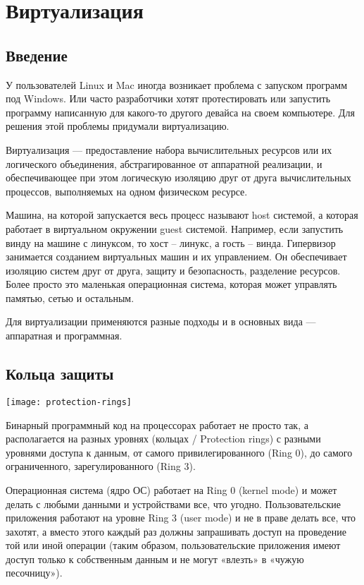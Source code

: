 \section{Виртуализация}
\subsection{Введение}
У пользователей Linux и Mac иногда возникает проблема с запуском программ под Windows.
Или часто разработчики хотят протестировать или запустить программу написанную для какого-то другого девайса на своем компьютере.
Для решения этой проблемы придумали виртуализацию.

Виртуализация — предоставление набора вычислительных ресурсов или их логического объединения, абстрагированное от аппаратной реализации, и обеспечивающее при этом логическую изоляцию друг от друга вычислительных процессов, выполняемых на одном физическом ресурсе.

Машина, на которой запускается весь процесс называют host системой, а которая работает в виртуальном окружении guest системой.
Например, если запустить винду на машине с линуксом, то хост -- линукс, а гость -- винда.
Гипервизор занимается созданием виртуальных машин и их управлением.
Он обеспечивает изоляцию систем друг от друга, защиту и безопасность, разделение ресурсов.
Более просто это маленькая операционная система, которая может управлять памятью, сетью и остальным.

Для виртуализации применяются разные подходы и в основных вида --- аппаратная и программная.

\subsection{Кольца защиты}
\texttt{[image: protection-rings]}

Бинарный программный код на процессорах работает не просто так, а располагается на разных уровнях (кольцах / Protection rings) с разными уровнями доступа к данным, от самого привилегированного (Ring 0), до самого ограниченного, зарегулированного (Ring 3).

Операционная система (ядро ОС) работает на Ring 0 (kernel mode) и может делать с любыми данными и устройствами все, что угодно.
Пользовательские приложения работают на уровне Ring 3 (user mode) и не в праве делать все, что захотят, а вместо этого каждый раз должны запрашивать доступ на проведение той или иной операции (таким образом, пользовательские приложения имеют доступ только к собственным данным и не могут «влезть» в «чужую песочницу»).

